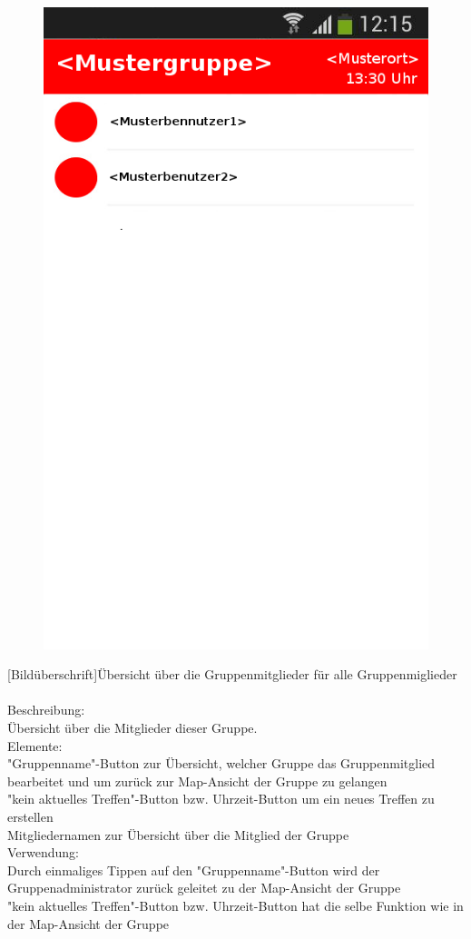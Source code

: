 \begin{figure}
	\includegraphics[scale =1]{resources/images/gruppendetails.png}
\end{figure}
[Bildüberschrift]Übersicht über die Gruppenmitglieder für alle Gruppenmiglieder\\ \\
[Kleinüberschrift]Beschreibung:\\
Übersicht über die Mitglieder dieser Gruppe.\\
[Kleinüberschrift]Elemente:\\
"Gruppenname"-Button zur Übersicht, welcher Gruppe das Gruppenmitglied  bearbeitet und um zurück zur Map-Ansicht der Gruppe zu gelangen\\
"kein aktuelles Treffen"-Button bzw. Uhrzeit-Button um ein neues Treffen zu erstellen\\
Mitgliedernamen zur Übersicht über die Mitglied der Gruppe\\
[Kleinüberschrift]Verwendung:\\
Durch einmaliges Tippen auf den "Gruppenname"-Button wird der Gruppenadministrator zurück geleitet zu der Map-Ansicht der Gruppe\\
"kein aktuelles Treffen"-Button bzw. Uhrzeit-Button hat die selbe Funktion wie in der Map-Ansicht der Gruppe\\

